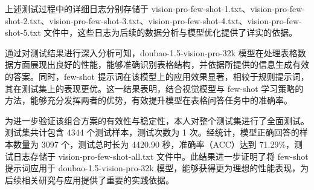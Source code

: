\documentclass[10.5pt,compsoc]{CjC}
\theoremstyle{mystyle}
\begin{document}
\begin{CJK*}{UTF8}{zhhei}





上述测试过程中的详细日志分别存储于 vision-pro-few-shot-1.txt、vision-pro-few-shot-2.txt、vision-pro-few-shot-3.txt、vision-pro-few-shot-4.txt、vision-pro-few-shot-5.txt 文件中，这些日志为后续的数据分析与模型优化提供了详实的依据。

通过对测试结果进行深入分析可知，doubao-1.5-vision-pro-32k 模型在处理表格数据方面展现出良好的性能，能够准确识别表格结构，并依据所提供的信息生成有效的答案。同时，few-shot 提示词在该模型上的应用效果显著，相较于规则提示词，其在测试集上的表现更优。这一结果表明，结合视觉模型与 few-shot 学习策略的方法，能够充分发挥两者的优势，有效提升模型在表格问答任务中的准确率。

为进一步验证该组合方案的有效性与稳定性，本人对整个测试集进行了全面测试。测试集共计包含 4344 个测试样本，测试次数为 1 次。经统计，模型正确回答的样本数量为 3097 个，测试总时长为 4420.90 秒，准确率（ACC）达到 71.29\%，测试日志存储于 vision-pro-few-shot-all.txt 文件中。此结果进一步证明了将 few-shot 提示词应用于 doubao-1.5-vision-pro-32k 模型，能够获得更为理想的性能表现，为后续相关研究与应用提供了重要的实践依据。


\end{CJK*}
\end{document}
